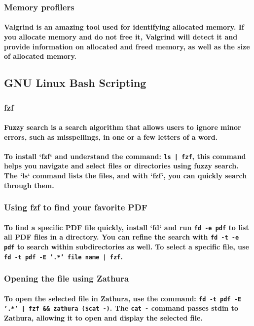 \documentclass[11pt]{article}
\begin{document}
\subsubsection{Memory profilers}
\paragraph{\small Valgrind is an amazing tool used for identifying allocated memory. If you allocate memory and do not free it, Valgrind will detect it and provide information on allocated and freed memory, as well as the size of allocated memory.}

\subsection{GNU Linux Bash Scripting}
\subsubsection{fzf}
\paragraph{\small Fuzzy search is a search algorithm that allows users to ignore minor errors, such as misspellings, in one or a few letters of a word.}
\paragraph{\small To install `fzf` and understand the command: \texttt{ls | fzf}, this command helps you navigate and select files or directories using fuzzy search. The `ls` command lists the files, and with `fzf`, you can quickly search through them.}

\subsubsection{Using fzf to find your favorite PDF}
\paragraph{\small To find a specific PDF file quickly, install `fd` and run \texttt{fd -e pdf} to list all PDF files in a directory. You can refine the search with \texttt{fd -t -e pdf} to search within subdirectories as well. To select a specific file, use \texttt{fd -t pdf -E '.*' file name | fzf}.}

\subsubsection{Opening the file using Zathura}
\paragraph{\small To open the selected file in Zathura, use the command: \texttt{fd -t pdf -E '.*' | fzf \&\& zathura (\$cat -)}. The \texttt{cat -} command passes stdin to Zathura, allowing it to open and display the selected file.}
\end{document}
